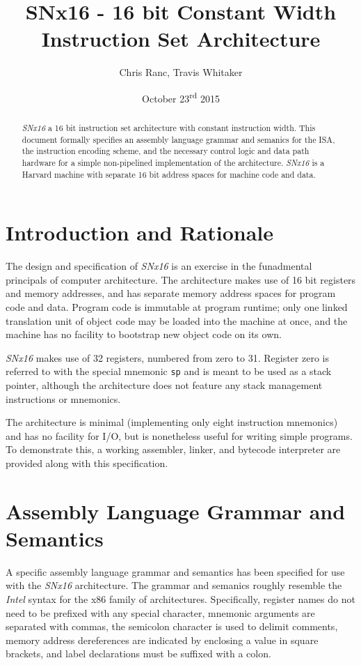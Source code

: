\documentclass{article}
\begin{document}
\title{SNx16 - 16 bit Constant Width Instruction Set Architecture}
\author{Chris Ranc, Travis Whitaker}
\date{October 23\textsuperscript{rd} 2015}
\maketitle

\begin{abstract}
\emph{SNx16} a 16 bit instruction set architecture with constant instruction
width. This document formally specifies an assembly language grammar and
semanics for the ISA, the instruction encoding scheme, and the necessary control
logic and data path hardware for a simple non-pipelined implementation of the
architecture. \emph{SNx16} is a Harvard machine with separate 16 bit address
spaces for machine code and data.
\end{abstract}

\section{Introduction and Rationale}

The design and specification of \emph{SNx16} is an exercise in the funadmental
principals of computer architecture. The architecture makes use of 16 bit
registers and memory addresses, and has separate memory address spaces for
program code and data. Program code is immutable at program runtime; only one
linked translation unit of object code may be loaded into the machine at once,
and the machine has no facility to bootstrap new object code on its own.

\emph{SNx16} makes use of 32 registers, numbered from zero to 31. Register zero
is referred to with the special mnemonic \texttt{sp} and is meant to be used as
a stack pointer, although the architecture does not feature any stack management
instructions or mnemonics.

The architecture is minimal (implementing only eight instruction mnemonics) and
has no facility for I/O, but is nonetheless useful for writing simple programs.
To demonstrate this, a working assembler, linker, and bytecode interpreter are
provided along with this specification.

\section{Assembly Language Grammar and Semantics}

A specific assembly language grammar and semantics has been specified for use
with the \emph{SNx16} architecture. The grammar and semanics roughly resemble
the \emph{Intel} syntax for the x86 family of architectures. Specifically,
register names do not need to be prefixed with any special character, mnemonic
arguments are separated with commas, the semicolon character is used to delimit
comments, memory address dereferences are indicated by enclosing a value in
square brackets, and label declarations must be suffixed with a colon.
\end{document}
